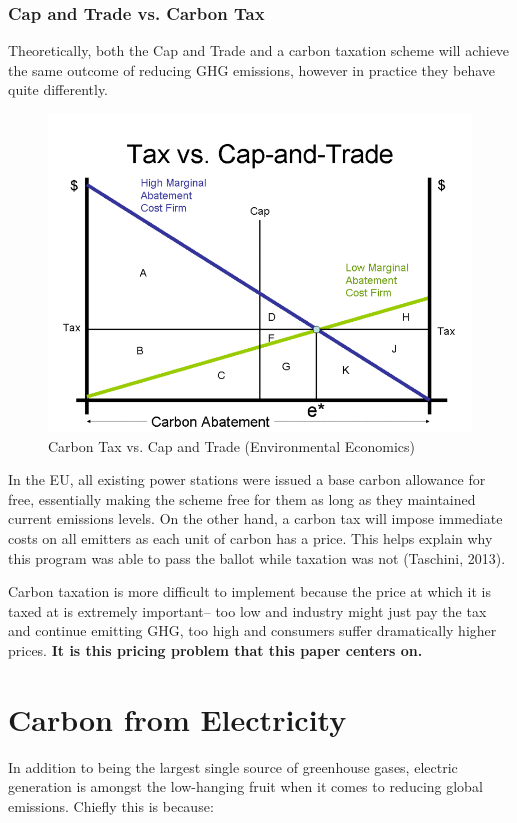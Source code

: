 \documentclass{article}
\begin{document}
\subsubsection{Cap and Trade vs. Carbon Tax}
Theoretically, both the Cap and Trade and a carbon taxation scheme will achieve the same outcome of reducing GHG emissions, however in practice they behave quite differently. 

\begin{figure}[H]
	\begin{center}
	\includegraphics[scale = .4]{Figures/captrade.png}
	\caption{Carbon Tax vs. Cap and Trade (Environmental Economics)}
	\end{center}
\end{figure}


In the EU, all existing power stations were issued a base carbon allowance for free, essentially making the scheme free for them as long as they maintained current emissions levels. On the other hand, a carbon tax will impose immediate costs on all emitters as each unit of carbon has a price. This helps explain why this program was able to pass the ballot while taxation was not (Taschini, 2013). \*

Carbon taxation is more difficult to implement because the price at which it is taxed at is extremely important-- too low and industry might just pay the tax and continue emitting GHG, too high and consumers suffer dramatically higher prices. {\bf It is this pricing problem that this paper centers on.}


\section{Carbon from Electricity}
In addition to being the largest single source of greenhouse gases, electric generation is amongst the low-hanging fruit when it comes to reducing global emissions. Chiefly this is because: 
\end{document}
